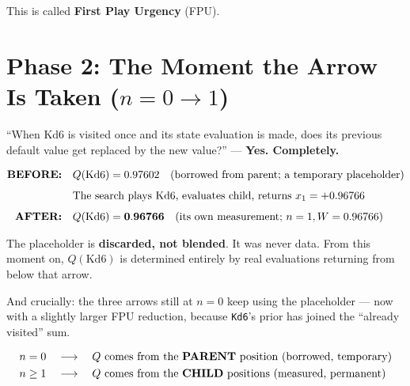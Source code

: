 This is called \textbf{First Play Urgency} (FPU).

\section{Phase 2: The Moment the Arrow Is Taken ($n = 0 \to 1$)}

\begin{studentq}
``When Kd6 is visited once and its state evaluation is made, does its previous default value get replaced by the new value?'' --- \textbf{Yes. Completely.}
\end{studentq}

\begin{align*}
  \text{\textbf{BEFORE:}} \quad & Q(\text{Kd6}) = 0.97602 \quad \text{(borrowed from parent; a temporary placeholder)} \\[1ex]
  & \text{The search plays Kd6, evaluates child, returns } x_1 = +0.96766 \\[1ex]
  \text{\textbf{AFTER:}} \quad & Q(\text{Kd6}) = \mathbf{0.96766} \quad \text{(its own measurement; } n = 1, W = 0.96766\text{)}
\end{align*}

\begin{center}
\begin{minipage}{\linewidth}
\centering

\label{fig:fpu}
\end{minipage}
\end{center}

The placeholder is \textbf{discarded, not blended}. It was never data. From this moment on, $Q(\text{Kd6})$ is determined entirely by real evaluations returning from below that arrow.

And crucially: the three arrows still at $n = 0$ keep using the placeholder --- now with a slightly larger FPU reduction, because \texttt{Kd6}'s prior has joined the ``already visited'' sum.

\begin{keyidea}[title={One Line to Remember}]
\begin{align*}
  n = 0 \quad &\longrightarrow \quad Q \text{ comes from the \textbf{PARENT} position (borrowed, temporary)} \\
  n \ge 1 \quad &\longrightarrow \quad Q \text{ comes from the \textbf{CHILD} positions (measured, permanent)}
\end{align*}
\end{keyidea}
